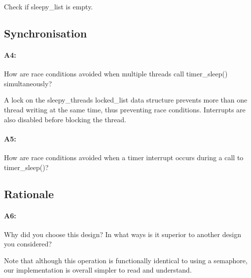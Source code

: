 \documentclass[11pt]{article}
\begin{document}
Check if sleepy\_list is empty.


\subsection{Synchronisation}
\paragraph{A4:} How are race conditions avoided when multiple threads call timer\_sleep() simultaneously?

A lock on the sleepy\_threads locked\_list data structure prevents more than one thread writing at the same time, thus preventing race conditions. Interrupts are also disabled before blocking the thread.

\paragraph{A5:} How are race conditions avoided when a timer interrupt occurs during a call to timer\_sleep()?

\subsection{Rationale}
\paragraph{A6:} Why did you choose this design? In what ways is it superior to another design you considered?

Note that although this operation is functionally identical to using a semaphore, our implementation is overall simpler to read and understand.
\end{document}
